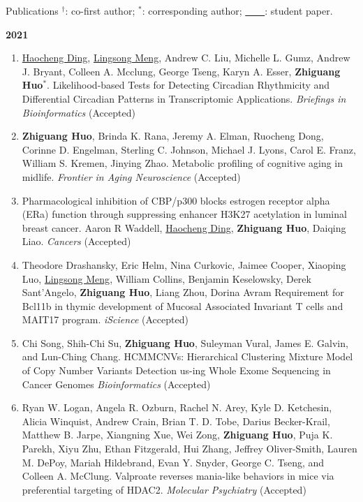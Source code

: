 \documentclass{resume} %
\begin{document}
\begin{rSection}{Publications}
$^\dagger$: co-first author; $^*$: corresponding author; \underline{\mbox{ }\mbox{ }\mbox{ }\mbox{ }}: student paper.

\textbf{2021}
\begin{enumerate}[noitemsep,topsep=0pt, resume]

\item
\underline{Haocheng Ding}, \underline{Lingsong Meng}, Andrew C. Liu, Michelle L. Gumz, Andrew J. Bryant, Colleen A. Mcclung, George Tseng, Karyn A. Esser, {\bf Zhiguang Huo}$^*$.
Likelihood-based Tests for Detecting Circadian Rhythmicity and Differential Circadian Patterns in Transcriptomic Applications. \emph{Briefings in Bioinformatics} (Accepted)

\item  {\bf Zhiguang Huo}, Brinda K. Rana, Jeremy A. Elman, Ruocheng Dong, Corinne D. Engelman, Sterling C. Johnson, Michael J. Lyons, Carol E. Franz, William S. Kremen, Jinying Zhao.
Metabolic profiling of cognitive aging in midlife.
\emph{Frontier in Aging Neuroscience} (Accepted)

\item
Pharmacological inhibition of CBP/p300 blocks estrogen receptor alpha (ERa) function through suppressing enhancer H3K27 acetylation in luminal breast cancer.
Aaron R Waddell, \underline{Haocheng Ding}, {\bf Zhiguang Huo}, Daiqing Liao. 
\emph{Cancers} (Accepted)

\item
Theodore Drashansky, Eric Helm, Nina Curkovic, Jaimee Cooper, Xiaoping Luo, \underline{Lingsong Meng}, William Collins, Benjamin Keselowsky, Derek Sant'Angelo, {\bf Zhiguang Huo}, Liang Zhou, Dorina Avram
Requirement for Bcl11b in thymic development of Mucosal Associated Invariant T cells and MAIT17 program. 
\emph{iScience} (Accepted)


\item  
Chi Song, Shih-Chi Su, {\bf Zhiguang Huo}, Suleyman Vural, James E. Galvin, and Lun-Ching Chang. HCMMCNVs: Hierarchical Clustering Mixture Model of Copy Number Variants Detection us-ing Whole Exome Sequencing in Cancer Genomes
\emph{Bioinformatics} (Accepted)


\item
Ryan W. Logan, Angela R. Ozburn, Rachel N. Arey, Kyle D. Ketchesin, Alicia Winquist, Andrew Crain, Brian T. D. Tobe, Darius Becker-Krail, Matthew B. Jarpe, Xiangning Xue, Wei Zong, {\bf Zhiguang Huo}, Puja K. Parekh, Xiyu Zhu, Ethan Fitzgerald, Hui Zhang, Jeffrey Oliver-Smith, Lauren M. DePoy, Mariah Hildebrand, Evan Y. Snyder, George C. Tseng, and Colleen A. McClung. Valproate reverses mania-like behaviors in mice via preferential targeting of HDAC2. \emph{Molecular Psychiatry} (Accepted)


\end{enumerate}
\end{rSection}
\end{document}
